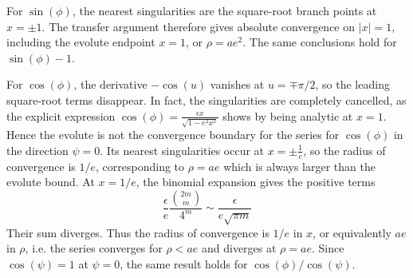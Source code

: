 \documentclass[a4paper]{amsart}
\begin{document}
For $\sin(\phi)$, the nearest singularities are the square-root branch points at $x=\pm1$. The transfer argument therefore gives absolute convergence on $|x|=1$, including the evolute endpoint $x=1$, or $\rho=ae^2$. The same conclusions hold for $\sin(\phi)-1$.


For \(\cos(\phi)\), the derivative \(-\cos(u)\) vanishes at \(u=\mp\pi/2\), so the leading square-root terms disappear. In fact, the singularities are completely cancelled, as the explicit expression $\cos(\phi)=\frac{\epsilon x}{\sqrt{1-e^2x^2}}$ shows by being analytic at $x=1$. Hence the evolute is not the convergence boundary for the series for $\cos(\phi)$ in the direction $\psi=0$. Its nearest singularities occur at $x=\pm\frac{1}{e}$, so the radius of convergence is $1/e$, corresponding to $\rho=ae$ which is always larger than the evolute bound.
%
At $x=1/e$, the binomial expansion gives the positive terms
\begin{equation*}
\frac{\epsilon}{e}\frac{\binom{2m}{m}}{4^m}
\sim\frac{\epsilon}{e\sqrt{\pi m}}
\end{equation*}
Their sum diverges. Thus the radius of convergence is $1/e$ in $x$, or equivalently $ae$ in $\rho$, i.e. the series converges for $\rho<ae$ and diverges at $\rho=ae$.
Since $\cos(\psi)=1$ at $\psi=0$, the same result holds for $\cos(\phi)/\cos(\psi)$.
\end{document}
